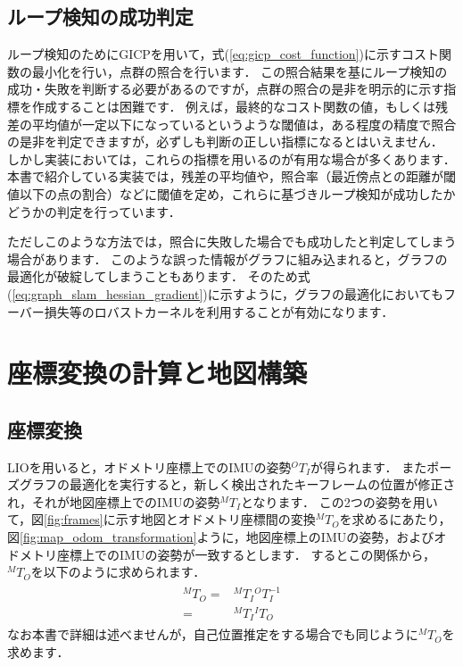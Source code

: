 \subsection{ループ検知の成功判定}

ループ検知のためにGICPを用いて，式(\ref{eq:gicp_cost_function})に示すコスト関数の最小化を行い，点群の照合を行います．
この照合結果を基にループ検知の成功・失敗を判断する必要があるのですが，点群の照合の是非を明示的に示す指標を作成することは困難です．
例えば，最終的なコスト関数の値，もしくは残差の平均値が一定以下になっているというような閾値は，ある程度の精度で照合の是非を判定できますが，必ずしも判断の正しい指標になるとはいえません．
しかし実装においては，これらの指標を用いるのが有用な場合が多くあります．
本書で紹介している実装では，残差の平均値や，照合率（最近傍点との距離が閾値以下の点の割合）などに閾値を定め，これらに基づきループ検知が成功したかどうかの判定を行っています．

ただしこのような方法では，照合に失敗した場合でも成功したと判定してしまう場合があります．
このような誤った情報がグラフに組み込まれると，グラフの最適化が破綻してしまうこともあります．
そのため式(\ref{eq:graph_slam_hessian_gradient})に示すように，グラフの最適化においてもフーバー損失等のロバストカーネルを利用することが有効になります．











\section{座標変換の計算と地図構築}

\subsection{座標変換}

LIOを用いると，オドメトリ座標上でのIMUの姿勢${}^{O}T_{I}$が得られます．
またポーズグラフの最適化を実行すると，新しく検出されたキーフレームの位置が修正され，それが地図座標上でのIMUの姿勢${}^{M}T_{I}$となります．
この2つの姿勢を用いて，図\ref{fig:frames}に示す地図とオドメトリ座標間の変換${}^{M}T_{O}$を求めるにあたり，図\ref{fig:map_odom_transformation}ように，地図座標上のIMUの姿勢，およびオドメトリ座標上でのIMUの姿勢が一致するとします．
するとこの関係から，${}^{M}T_{O}$を以下のように求められます．
%
\begin{align}
  \begin{split}
    {}^{M}T_{O} = & {}^{M}T_{I} {}^{O}T_{I}^{-1} \\
                = & {}^{M}T_{I} {}^{I}T_{O}
  \end{split}
\end{align}
%
なお本書で詳細は述べませんが，自己位置推定をする場合でも同じように${}^{M}T_{O}$を求めます．

